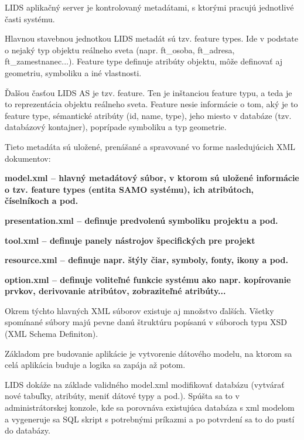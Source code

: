 LIDS aplikačný server je kontrolovaný metadátami, s ktorými pracujú jednotlivé časti systému. 

Hlavnou stavebnou jednotkou LIDS metadát sú tzv. feature types. Ide v podstate o nejaký typ objektu reálneho sveta (napr. ft\_osoba, ft\_adresa, ft\_zamestnanec...). Feature type definuje atribúty objektu, môže definovať aj geometriu, symboliku a iné vlastnosti. 

Ďalšou časťou LIDS AS je tzv. feature. Ten je inštanciou feature typu, a teda je to reprezentácia objektu reálneho sveta. Feature nesie informácie o tom, aký je to feature type, sémantické atribúty (id, name, type), jeho miesto v databáze (tzv. databázový kontajner), poprípade symboliku a typ geometrie.

Tieto metadáta sú uložené, prenášané a spravované vo forme nasledujúcich XML dokumentov:

\startitemize
\item{\start \bf model.xml \stop -- hlavný metadátový súbor, v ktorom sú uložené informácie o tzv. feature types (entita SAMO systému), ich atribútoch, číselníkoch a pod.}
\item{\start \bf presentation.xml \stop -- definuje predvolenú symboliku projektu a pod.}
\item{\start \bf tool.xml \stop -- definuje panely nástrojov špecifických pre projekt}
\item{\start \bf resource.xml \stop -- definuje napr. štýly čiar, symboly, fonty, ikony a pod.}
\item{\start \bf option.xml \stop -- definuje voliteľné funkcie systému ako napr. kopírovanie prvkov, derivovanie atribútov, zobraziteľné atribúty...}
\stopitemize 

Okrem týchto hlavných XML súborov existuje aj množstvo ďalších. Všetky spomínané súbory majú pevne danú štruktúru popísanú v súboroch typu XSD (XML Schema Definiton). 

Základom pre budovanie aplikácie je vytvorenie dátového modelu, na ktorom sa celá aplikácia buduje a logika sa zapája až potom. 

LIDS dokáže na základe validného model.xml modifikovať databázu (vytvárať nové tabuľky, atribúty, meniť dátové typy a pod.). Spúšta sa to v administrátorskej konzole, kde sa porovnáva existujúca databáza s xml modelom a vygeneruje sa SQL skript s potrebnými príkazmi a po potvrdení sa to do pustí do databázy.


